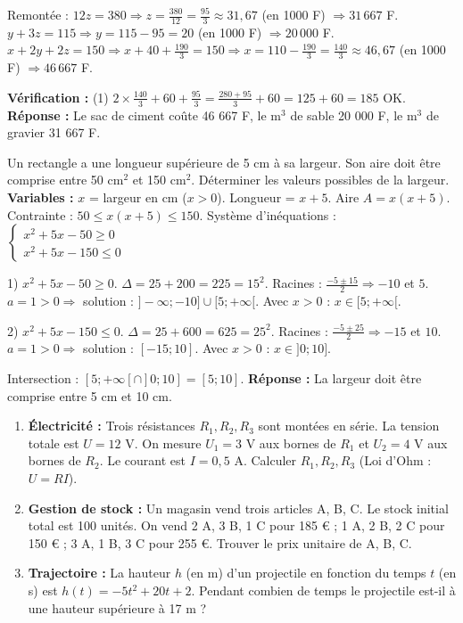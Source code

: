\documentclass[11pt]{article}
\begin{document}
\begin{exoresolu}
Remontée :
$12z = 380 \Rightarrow z = \frac{380}{12} = \frac{95}{3} \approx 31,67$ (en 1000 F) $\Rightarrow 31\,667$ F.
$y + 3z = 115 \Rightarrow y = 115 - 95 = 20$ (en 1000 F) $\Rightarrow 20\,000$ F.
$x + 2y + 2z = 150 \Rightarrow x + 40 + \frac{190}{3} = 150 \Rightarrow x = 110 - \frac{190}{3} = \frac{140}{3} \approx 46,67$ (en 1000 F) $\Rightarrow 46\,667$ F.

\textbf{Vérification :} (1) $2\times\frac{140}{3} + 60 + \frac{95}{3} = \frac{280+95}{3}+60 = 125+60=185$ OK.
\textbf{Réponse :} Le sac de ciment coûte 46 667 F, le m$^3$ de sable 20 000 F, le m$^3$ de gravier 31 667 F.
\end{exoresolu}

\begin{exoresolu}
Un rectangle a une longueur supérieure de 5 cm à sa largeur. Son aire doit être comprise entre 50 cm$^2$ et 150 cm$^2$. Déterminer les valeurs possibles de la largeur.
\tcblower
\textbf{Variables :} $x$ = largeur en cm ($x > 0$). Longueur = $x+5$.
Aire $A = x(x+5)$.
Contrainte : $50 \le x(x+5) \le 150$.
Système d'inéquations :
$\begin{cases} x^2 + 5x - 50 \ge 0 \\ x^2 + 5x - 150 \le 0 \end{cases}$

1) $x^2 + 5x - 50 \ge 0$. $\Delta = 25 + 200 = 225 = 15^2$. Racines : $\frac{-5 \pm 15}{2} \Rightarrow -10$ et $5$.
$a=1>0 \Rightarrow$ solution : $]-\infty; -10] \cup [5; +\infty[$.
Avec $x>0$ : $x \in [5; +\infty[$.

2) $x^2 + 5x - 150 \le 0$. $\Delta = 25 + 600 = 625 = 25^2$. Racines : $\frac{-5 \pm 25}{2} \Rightarrow -15$ et $10$.
$a=1>0 \Rightarrow$ solution : $[-15; 10]$.
Avec $x>0$ : $x \in ]0; 10]$.

Intersection : $[5; +\infty[ \cap ]0; 10] = [5; 10]$.
\textbf{Réponse :} La largeur doit être comprise entre 5 cm et 10 cm.
\end{exoresolu}

\begin{exercice}
\begin{enumerate}
  \item \textbf{Électricité :} Trois résistances $R_1, R_2, R_3$ sont montées en série. La tension totale est $U = 12$ V. On mesure $U_1 = 3$ V aux bornes de $R_1$ et $U_2 = 4$ V aux bornes de $R_2$. Le courant est $I = 0,5$ A. Calculer $R_1, R_2, R_3$ (Loi d'Ohm : $U = RI$).
  \item \textbf{Gestion de stock :} Un magasin vend trois articles A, B, C. Le stock initial total est 100 unités. On vend 2 A, 3 B, 1 C pour 185 € ; 1 A, 2 B, 2 C pour 150 € ; 3 A, 1 B, 3 C pour 255 €. Trouver le prix unitaire de A, B, C.
  \item \textbf{Trajectoire :} La hauteur $h$ (en m) d'un projectile en fonction du temps $t$ (en s) est $h(t) = -5t^2 + 20t + 2$. Pendant combien de temps le projectile est-il à une hauteur supérieure à 17 m ?
\end{enumerate}
\end{exercice}
\end{document}
